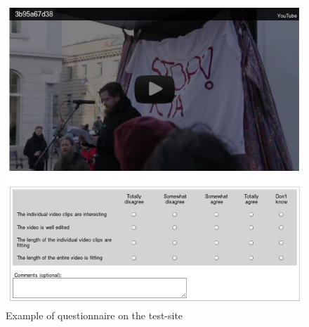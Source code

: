 %
\begin{figure}
     \centering
     \includegraphics[width=1.0\textwidth]{img/quest_dump.png}
     \caption{Example of questionnaire on the test-site}\label{fig:questdump}
\end{figure}
%
